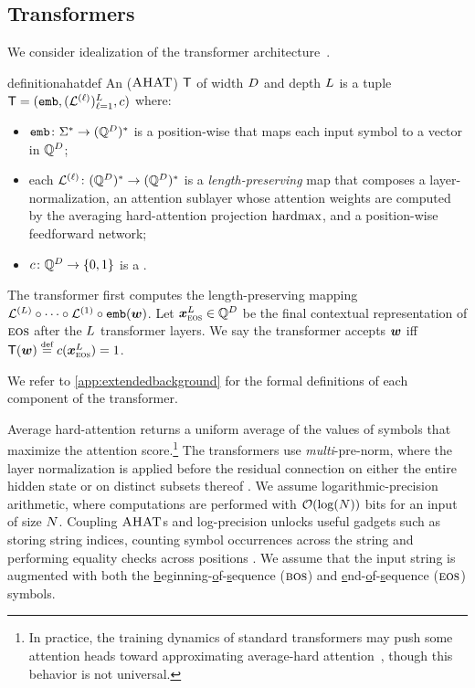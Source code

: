 \documentclass{article}
\begin{document}
\subsection{Transformers}\label{subsec:transformersprelim}
We consider  idealization of the transformer architecture~\citep{merrill-2025littledepthgoeslong}.
\begin{restatable}{definition}{ahatdef}\label{def:ahat}
    An  (${{\textsc{AHAT}}}$) $\tf$ of width ${{ D}}$ and depth ${L}$ is a tuple $\tf = (\embedFunc, (\tflayer^{(\layerIdx)})_{\layerIdx=1}^{\nLayers}, \funcc)$ where:
    \begin{itemize}[noitemsep,topsep=0pt,leftmargin=15pt,parsep=0pt,partopsep=0pt]
        \item ${\texttt{emb}} \colon {{{{ \Sigma}}^*}} \to {{({{ \mathbb{Q}}}^{{ D}})^*}}$ is a position-wise  that maps each input symbol to a vector in ${{ \mathbb{Q}}}^{{ D}}$;
        \item each  ${\mathrm{\mathcal{L}}}^{({\ell})} \colon {{({{ \mathbb{Q}}}^{{ D}})^*}} \to {{({{ \mathbb{Q}}}^{{ D}})^*}}$ is a \emph{length-preserving} map that composes a layer-normalization, an attention sublayer whose attention weights are computed by the averaging hard-attention projection ${{\mathrm{hardmax}}}$, and a position-wise feedforward network;
        \item ${{ c}} \colon {{ \mathbb{Q}}}^{{ D}} \to {{\{ 0,1 \}}}$ is a .
    \end{itemize}
    The transformer first computes the length-preserving mapping ${\mathrm{\mathcal{L}}}^{({L})} \circ \cdots \circ {\mathrm{\mathcal{L}}}^{(1)} \circ {\texttt{emb}}({{\boldsymbol{w}}})$. 
    Let ${{{ \bm{x}}}}_{{{\textsc{eos}}}}^{{L}} \in {{ \mathbb{Q}}}^{{ D}}$ be the final contextual representation of ${{\textsc{eos}}}$ after the ${L}$ transformer layers.
    We say the transformer accepts ${{\boldsymbol{w}}}$ iff $\tf(\str)\defeq\funcc(\vx_{\eos}^{\nLayers})=1$.
\end{restatable}
We refer to \cref{app:extendedbackground} for the formal definitions of each component of the transformer.

Average hard-attention returns a uniform average of the values of symbols that maximize the attention score.\footnote{In practice, the training dynamics of standard transformers may push some attention heads toward approximating average-hard attention~\citep{merrill-etal-2021-effects}, though this behavior is not universal.}
The transformers use \emph{multi}-pre-norm, where the layer normalization is applied before the residual connection on either the entire hidden state or on distinct subsets thereof \citep{merrill2024expressivepowertransformerschain}.
We assume logarithmic-precision arithmetic, where computations are performed with ${{ \mathcal{O}}}(\log({{ N}}))$ bits for an input of size ${{ N}}$. 
Coupling ${{\textsc{AHAT}}}$s and log-precision unlocks useful gadgets such as storing string indices, counting symbol occurrences across the string and performing equality checks across positions \citep{merrill2024expressivepowertransformerschain}.
We assume that the input string is augmented with both the \underline{b}eginning-\underline{o}f-\underline{s}equence (${{\textsc{bos}}}$) and \underline{e}nd-\underline{o}f-\underline{s}equence (${{\textsc{eos}}}$) symbols.
\end{document}
